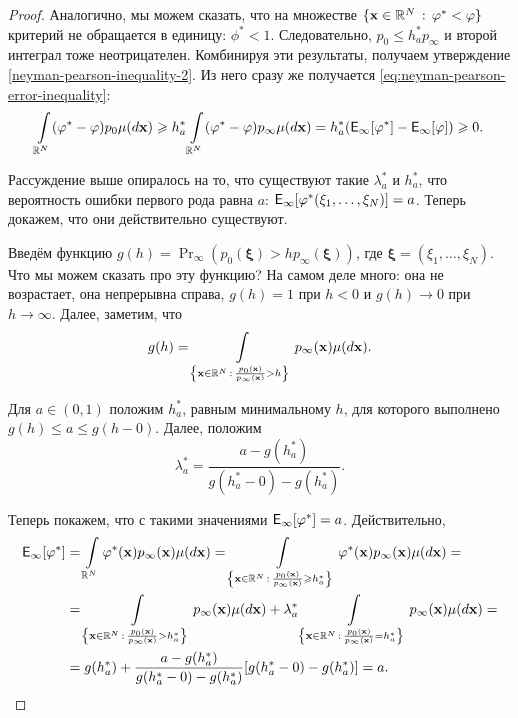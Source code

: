 \begin{proof}
	Аналогично, мы можем сказать, что на множестве \(\{\mathbf{x} \in 
	\mathbb{R}^{N}\,:\,\varphi^{*} < \varphi\}\) критерий не обращается в единицу: \(\phi^{*} 
	< 1\). Следовательно, \(p_{0} \leq h_{a}^{*}p_{\infty}\) и второй интеграл 
	тоже неотрицателен. Комбинируя эти результаты, получаем утверждение 
	\eqref{neyman-pearson-inequality-2}. Из него сразу же получается 
	\eqref{eq:neyman-pearson-error-inequality}:
	\begin{align}
		\int\limits_{\R^{N}} (\phi^{*} - \phi)p_{0}\mu(\diff \mathbf{x}) \geq 
		h_{a}^{*} \int\limits_{\R^{N}} (\phi^{*} - \phi)p_{\infty}\mu(\diff 
		\mathbf{x}) = h_{a}^{*}(\E_{\infty}[\phi^{*}] - \E_{\infty}[\phi]) \geq 
		0.
	\end{align}
	
	Рассуждение выше опиралось на то, что существуют такие \(\lambda_{a}^{*}\) 
	и \(h_{a}^{*}\), что вероятность ошибки первого рода равна \(a\): 
	\(\E_{\infty}[\phi^{*}(\xi_{1}, \ldots, \xi_{N})] = a\). Теперь докажем, 
	что они действительно существуют.
	
	Введём функцию \(g(h) = \Pr_{\infty}(p_{0}(\bm{\xi}) > 
	hp_{\infty}(\bm{\xi}))\), где \(\bm{\xi} = (\xi_{1}, \ldots, \xi_{N})\). 
	Что мы можем сказать про эту функцию? На самом деле много: она не 
	возрастает, она непрерывна справа, \(g(h) = 1\) при \(h < 0\) и \(g(h) \to 
	0\) при \(h \to \infty\). Далее, заметим, что
	\begin{equation}
		g(h) = \int\limits_{\left\{\mathbf{x} \in 
		\mathbb{R}^{N}\,:\,\frac{p_{0}(\mathbf{x})}{p_{\infty}(\mathbf{x})} > 
		h\right\}} p_{\infty}(\mathbf{x})\mu(\mathop{}\!d \mathbf{x}).
	\end{equation}
	
	Для \(a \in (0, 1)\) положим \(h_{a}^{*}\), равным минимальному \(h\), для 
	которого выполнено \(g(h) \leq a \leq g(h - 0)\). Далее, положим
	\begin{equation}
		\lambda_{a}^{*} = \frac{a - g(h_{a}^{*})}{g(h_{a}^{*} - 0) - 
		g(h_{a}^{*})}.
	\end{equation}
	
	Теперь покажем, что с такими значениями \(\E_{\infty}[\phi^{*}] = a\). 
	Действительно,
	\begin{align*}
		\E_{\infty}[\phi^{*}] &= \int\limits_{\R^{N}} \phi^{*}(\mathbf{x}) 
		p_{\infty}(\mathbf{x})\mu(\diff \mathbf{x}) = \int\limits_{\left 
		\{\mathbf{x} \in \R^{N}\,:\,\frac{p_{0}(\mathbf{x})} {p_{\infty} 
		(\mathbf{x})} \geq h_{a}^{*}\right\}} \phi^{*}(\mathbf{x}) 
		p_{\infty}(\mathbf{x})\mu(\diff \mathbf{x}) = \\
		&= \int\limits_{\left \{\mathbf{x} \in \R^{N}\,:\,\frac{p_{0} 
		(\mathbf{x})} {p_{\infty}(\mathbf{x})} > h_{a}^{*}\right\}} 
		p_{\infty}(\mathbf{x})\mu(\diff \mathbf{x}) + 
		\lambda_{a}^{*}\int\limits_{\left\{\mathbf{x} \in 
		\R^{N}\,:\,\frac{p_{0} (\mathbf{x})} {p_{\infty}(\mathbf{x})} = 
		h_{a}^{*}\right\}} p_{\infty}(\mathbf{x})\mu(\diff \mathbf{x}) = \\
		&= g(h_{a}^{*}) + \frac{a - g(h_{a}^{*})}{g(h_{a}^{*} - 0) - 
		g(h_{a}^{*})}[g(h_{a}^{*} - 0) - g(h_{a}^{*})] = a.
	\end{align*}
	

\end{proof}
